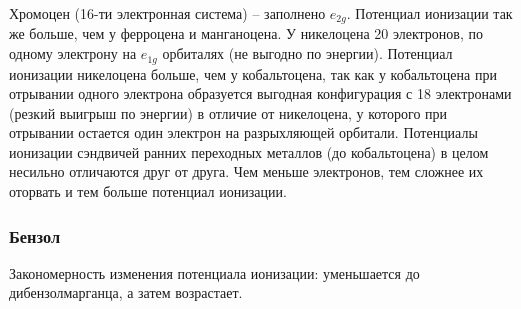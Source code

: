Хромоцен (16-ти электронная система) – заполнено $e_{2g}$. Потенциал ионизации так же больше, чем у ферроцена и манганоцена. 
У никелоцена 20 электронов, по одному электрону на $e_{1g}$ орбиталях (не выгодно по энергии). Потенциал ионизации никелоцена больше, чем у кобальтоцена, так как у кобальтоцена при отрывании одного электрона образуется выгодная конфигурация с 18 электронами (резкий выигрыш по энергии) в отличие от никелоцена, у которого при отрывании остается один электрон на разрыхляющей орбитали. 
Потенциалы ионизации сэндвичей ранних переходных металлов (до кобальтоцена) в целом несильно отличаются друг от друга. Чем меньше электронов, тем сложнее их оторвать и тем больше потенциал ионизации. 

\subsubsection*{Бензол}

Закономерность изменения потенциала ионизации: уменьшается до дибензолмарганца, а затем возрастает. 

